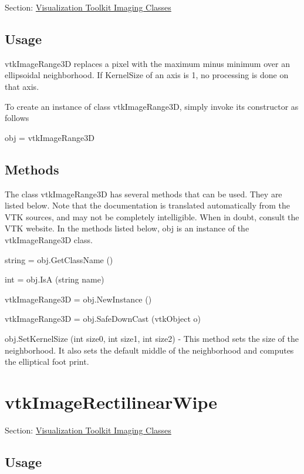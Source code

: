 Section\-: \hyperlink{sec_vtkimaging}{Visualization Toolkit Imaging Classes} \hypertarget{vtkwidgets_vtkxyplotwidget_Usage}{}\subsection{Usage}\label{vtkwidgets_vtkxyplotwidget_Usage}
vtk\-Image\-Range3\-D replaces a pixel with the maximum minus minimum over an ellipsoidal neighborhood. If Kernel\-Size of an axis is 1, no processing is done on that axis.

To create an instance of class vtk\-Image\-Range3\-D, simply invoke its constructor as follows \begin{DoxyVerb}  obj = vtkImageRange3D
\end{DoxyVerb}
 \hypertarget{vtkwidgets_vtkxyplotwidget_Methods}{}\subsection{Methods}\label{vtkwidgets_vtkxyplotwidget_Methods}
The class vtk\-Image\-Range3\-D has several methods that can be used. They are listed below. Note that the documentation is translated automatically from the V\-T\-K sources, and may not be completely intelligible. When in doubt, consult the V\-T\-K website. In the methods listed below, {\ttfamily obj} is an instance of the vtk\-Image\-Range3\-D class. 
\begin{DoxyItemize}
\item {\ttfamily string = obj.\-Get\-Class\-Name ()}  
\item {\ttfamily int = obj.\-Is\-A (string name)}  
\item {\ttfamily vtk\-Image\-Range3\-D = obj.\-New\-Instance ()}  
\item {\ttfamily vtk\-Image\-Range3\-D = obj.\-Safe\-Down\-Cast (vtk\-Object o)}  
\item {\ttfamily obj.\-Set\-Kernel\-Size (int size0, int size1, int size2)} -\/ This method sets the size of the neighborhood. It also sets the default middle of the neighborhood and computes the elliptical foot print.  
\end{DoxyItemize}\hypertarget{vtkimaging_vtkimagerectilinearwipe}{}\section{vtk\-Image\-Rectilinear\-Wipe}\label{vtkimaging_vtkimagerectilinearwipe}
Section\-: \hyperlink{sec_vtkimaging}{Visualization Toolkit Imaging Classes} \hypertarget{vtkwidgets_vtkxyplotwidget_Usage}{}\subsection{Usage}\label{vtkwidgets_vtkxyplotwidget_Usage}
